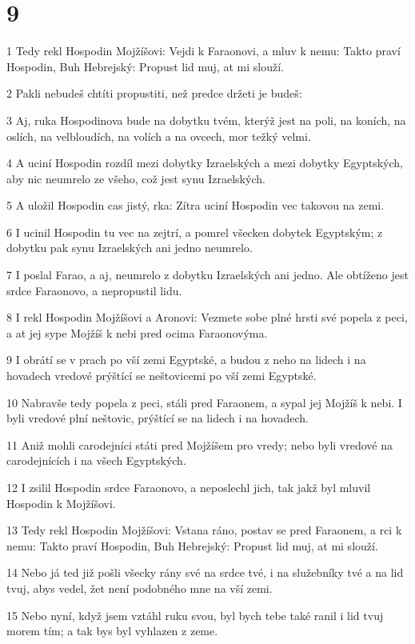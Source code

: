 \chapter{9}

\par 1 Tedy rekl Hospodin Mojžíšovi: Vejdi k Faraonovi, a mluv k nemu: Takto praví Hospodin, Buh Hebrejský: Propust lid muj, at mi slouží.
\par 2 Pakli nebudeš chtíti propustiti, než predce držeti je budeš:
\par 3 Aj, ruka Hospodinova bude na dobytku tvém, kterýž jest na poli, na koních, na oslích, na velbloudích, na volích a na ovcech, mor težký velmi.
\par 4 A uciní Hospodin rozdíl mezi dobytky Izraelských a mezi dobytky Egyptských, aby nic neumrelo ze všeho, což jest synu Izraelských.
\par 5 A uložil Hospodin cas jistý, rka: Zítra uciní Hospodin vec takovou na zemi.
\par 6 I ucinil Hospodin tu vec na zejtrí, a pomrel všecken dobytek Egyptským; z dobytku pak synu Izraelských ani jedno neumrelo.
\par 7 I poslal Farao, a aj, neumrelo z dobytku Izraelských ani jedno. Ale obtíženo jest srdce Faraonovo, a nepropustil lidu.
\par 8 I rekl Hospodin Mojžíšovi a Aronovi: Vezmete sobe plné hrsti své popela z peci, a at jej sype Mojžíš k nebi pred ocima Faraonovýma.
\par 9 I obrátí se v prach po vší zemi Egyptské, a budou z neho na lidech i na hovadech vredové prýštící se neštovicemi po vší zemi Egyptské.
\par 10 Nabravše tedy popela z peci, stáli pred Faraonem, a sypal jej Mojžíš k nebi. I byli vredové plní neštovic, prýštící se na lidech i na hovadech.
\par 11 Aniž mohli carodejníci státi pred Mojžíšem pro vredy; nebo byli vredové na carodejnících i na všech Egyptských.
\par 12 I zsilil Hospodin srdce Faraonovo, a neposlechl jich, tak jakž byl mluvil Hospodin k Mojžíšovi.
\par 13 Tedy rekl Hospodin Mojžíšovi: Vstana ráno, postav se pred Faraonem, a rci k nemu: Takto praví Hospodin, Buh Hebrejský: Propust lid muj, at mi slouží.
\par 14 Nebo já ted již pošli všecky rány své na srdce tvé, i na služebníky tvé a na lid tvuj, abys vedel, žet není podobného mne na vší zemi.
\par 15 Nebo nyní, když jsem vztáhl ruku svou, byl bych tebe také ranil i lid tvuj morem tím; a tak bys byl vyhlazen z zeme.
